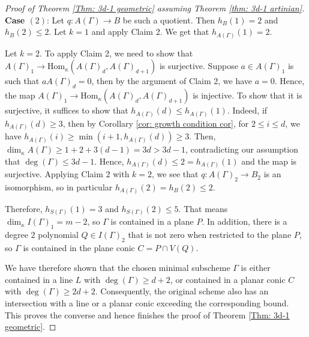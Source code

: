 \documentclass[11pt]{amsart}
\newtheorem{lemma}[theorem]{Lemma}
\theoremstyle{definition}
\newcommand{\Agz}{A(\Gamma)}
\newcommand{\sg}{S(\Gamma)}
\newcommand{\ag}{A(\Gamma)}
\newcommand{\Supp}{\operatorname{Supp}}
\newcommand{\gz}{\Gamma}
\newcommand{\PPP}{\mathbb{P}}
\newcommand{\dimk}{\dim_{\kappa}}
\newcommand{\ka}{\kappa}
\newcommand{\Ag}{A(\Gamma)}
\begin{document}
\begin{proof}[Proof of Theorem \ref{Thm: 3d-1 geometric} assuming Theorem \ref{thm: 3d-1 artinian}]
\noindent\textbf{Case $(2)$}: 
Let $q: \ag \to B$ be such a quotient. Then $h_B(1)=2$ and $h_B(2) \leq 2$. Let $k=1$ and apply Claim 2. We get that $h_{\ag}(1)=2$. 

Let $k=2$. To apply Claim 2, we need to show that $A(\Gamma)_1 \to \text{Hom}_\ka(\Ag_{d}, \ag_{d+1})$ is surjective. Suppose $a \in A(\Gamma)_1$ is such that $aA(\Gamma)_d=0$, then by the argument of Claim 2, we have $a=0$. Hence, the map $\ag_1 \to \text{Hom}_\ka(\Ag_{d}, \Ag_{d+1})$ is injective. To show that it is surjective, it suffices to show that $h_{\ag}(d)  \leq h_{\ag}(1)$. Indeed, if $h_{\ag}(d) \geq 3$, then by Corollary \ref{cor: growth condition cor}, for $2 \leq i \leq d$, we have $h_{\ag}(i) \geq \min(i+1, h_{\ag}(d)) \geq 3$. Then, $\dimk \ag \ge 1+2+3(d-1) =3d >3d-1$, contradicting our assumption that $\deg(\Gamma) \leq 3d-1$. Hence, $h_{\ag}(d)  \leq 2=h_{\ag}(1)$ and the map is surjective. Applying Claim 2 with $k=2$, we see that $q: \Ag_2 \to B_2$ is an isomorphism, so in particular $h_{\ag}(2)=h_B(2) \leq 2$. 

Therefore, $h_{\sg}(1)=3$ and $h_{\sg}(2) \leq 5$. That means $\dimk I(\Gamma)_1 =m-2$, so $\Gamma$ is contained in a plane $P$. In addition, there is a degree $2$ polynomial $Q \in I(\Gamma)_2$ that is not zero when restricted to the plane $P$, so $\Gamma$ is contained in the plane conic $C=P \cap V(Q)$.

We have therefore shown that the chosen minimal subscheme
$\Gamma$ is either contained in a line $L$ with
$\deg(\Gamma)\geq d+2$, or contained in a planar conic $C$
with $\deg(\Gamma)\geq 2d+2$.
Consequently, the original scheme also has an intersection with a line or a planar conic exceeding the corresponding bound. This proves the converse and hence finishes the proof of Theorem \ref{Thm: 3d-1 geometric}.
\end{proof}







\end{document}
